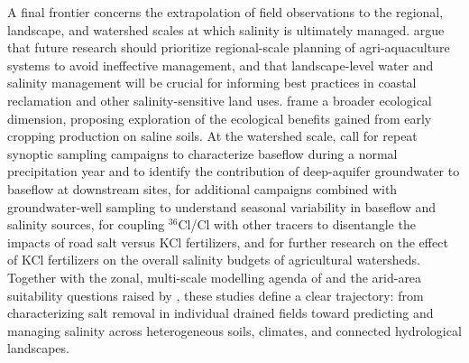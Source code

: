 A final frontier concerns the extrapolation of field observations to the regional, landscape, and watershed scales at which salinity is ultimately managed. \textcite{Yu2025} argue that future research should prioritize regional-scale planning of agri-aquaculture systems to avoid ineffective management, and that landscape-level water and salinity management will be crucial for informing best practices in coastal reclamation and other salinity-sensitive land uses. \textcite{Chen2025} frame a broader ecological dimension, proposing exploration of the ecological benefits gained from early cropping production on saline soils. At the watershed scale, \textcite{Frisbee2022} call for repeat synoptic sampling campaigns to characterize baseflow during a normal precipitation year and to identify the contribution of deep-aquifer groundwater to baseflow at downstream sites, for additional campaigns combined with groundwater-well sampling to understand seasonal variability in baseflow and salinity sources, for coupling $^{36}$Cl/Cl with other tracers to disentangle the impacts of road salt versus KCl fertilizers, and for further research on the effect of KCl fertilizers on the overall salinity budgets of agricultural watersheds. Together with the zonal, multi-scale modelling agenda of \textcite{Zhu2025b} and the arid-area suitability questions raised by \textcite{Guo2024b}, these studies define a clear trajectory: from characterizing salt removal in individual drained fields toward predicting and managing salinity across heterogeneous soils, climates, and connected hydrological landscapes.